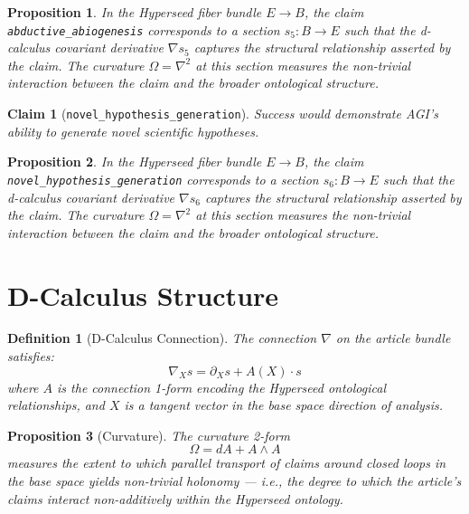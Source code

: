 \documentclass{article}
\newtheorem{claim}{Claim}
\newtheorem{definition}{Definition}
\newtheorem{proposition}{Proposition}
\begin{document}
\begin{proposition}
In the Hyperseed fiber bundle $E \to B$, the claim \texttt{abductive_abiogenesis} corresponds to a section $s_5: B \to E$ such that the d-calculus covariant derivative $\nabla s_5$ captures the structural relationship asserted by the claim. The curvature $\Omega = \nabla^2$ at this section measures the non-trivial interaction between the claim and the broader ontological structure.
\end{proposition}

\begin{claim}[\texttt{novel_hypothesis_generation}]
Success would demonstrate AGI's ability to generate novel scientific hypotheses.
\end{claim}

\begin{proposition}
In the Hyperseed fiber bundle $E \to B$, the claim \texttt{novel_hypothesis_generation} corresponds to a section $s_6: B \to E$ such that the d-calculus covariant derivative $\nabla s_6$ captures the structural relationship asserted by the claim. The curvature $\Omega = \nabla^2$ at this section measures the non-trivial interaction between the claim and the broader ontological structure.
\end{proposition}

\section{D-Calculus Structure}

\begin{definition}[D-Calculus Connection]
The connection $\nabla$ on the article bundle satisfies:
\begin{equation}
  \nabla_X s = \partial_X s + A(X) \cdot s
\end{equation}
where $A$ is the connection 1-form encoding the Hyperseed ontological relationships, and $X$ is a tangent vector in the base space direction of analysis.
\end{definition}

\begin{proposition}[Curvature]
The curvature 2-form
\begin{equation}
  \Omega = dA + A \wedge A
\end{equation}
measures the extent to which parallel transport of claims around closed loops in the base space yields non-trivial holonomy --- i.e., the degree to which the article's claims interact non-additively within the Hyperseed ontology.
\end{proposition}
\end{document}
